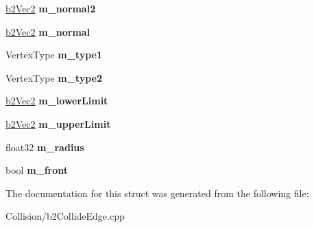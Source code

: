 \begin{DoxyCompactItemize}
\mbox{\hyperlink{structb2Vec2}{b2\+Vec2}} {\bfseries m\+\_\+normal2}
\item 
\mbox{\label{structb2EPCollider_a67ff23f9fada3a733928380da8653348}} 
\mbox{\hyperlink{structb2Vec2}{b2\+Vec2}} {\bfseries m\+\_\+normal}
\item 
\mbox{\label{structb2EPCollider_ad2541e4c9358d5ffcaca19b25836392b}} 
Vertex\+Type {\bfseries m\+\_\+type1}
\item 
\mbox{\label{structb2EPCollider_a71889f34bef412e3cbfbbab605210b7e}} 
Vertex\+Type {\bfseries m\+\_\+type2}
\item 
\mbox{\label{structb2EPCollider_a6b48818ac312de825aaf55b46aceea1e}} 
\mbox{\hyperlink{structb2Vec2}{b2\+Vec2}} {\bfseries m\+\_\+lower\+Limit}
\item 
\mbox{\label{structb2EPCollider_a5da77944d10d87ca7222e3d8d00ac205}} 
\mbox{\hyperlink{structb2Vec2}{b2\+Vec2}} {\bfseries m\+\_\+upper\+Limit}
\item 
\mbox{\label{structb2EPCollider_a1efd359a8c17680bbdef093dd07fbb9d}} 
float32 {\bfseries m\+\_\+radius}
\item 
\mbox{\label{structb2EPCollider_aa9443e27e043bf80916992ca96bdedd2}} 
bool {\bfseries m\+\_\+front}
\end{DoxyCompactItemize}


The documentation for this struct was generated from the following file\+:\begin{DoxyCompactItemize}
\item 
Collision/b2\+Collide\+Edge.\+cpp\end{DoxyCompactItemize}
